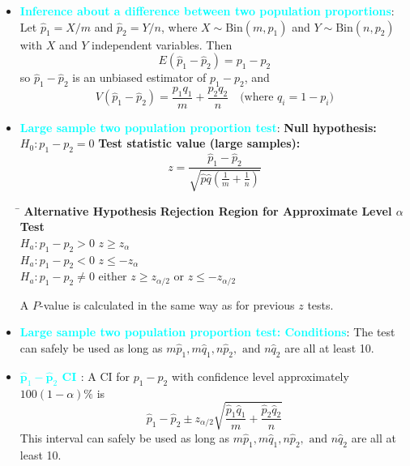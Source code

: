 \documentclass{report}
\begin{document}
\begin{itemize}
    \item \textbf{\textcolor{cyan}{Inference about a difference between two population proportions}}:
        Let $\hat{p}_1 = X/m$ and $\hat{p}_2 = Y/n$, where $X \sim \text{Bin}(m, p_1)$ and $Y \sim \text{Bin}(n, p_2)$ with $X$ and $Y$ independent variables. Then
        \[
            E(\hat{p}_1 - \hat{p}_2) = p_1 - p_2
        \]
        so $\hat{p}_1 - \hat{p}_2$ is an unbiased estimator of $p_1 - p_2$, and
        \[
            V(\hat{p}_1 - \hat{p}_2) = \frac{p_1 q_1}{m} + \frac{p_2 q_2}{n} \quad \text{(where } q_i = 1 - p_i\text{)}
        \]
    \item \textbf{\textcolor{cyan}{Large sample two population proportion test}}:
        \bigbreak \noindent 
        \textbf{Null hypothesis:} $H_0: p_1 - p_2 = 0$
        \bigbreak \noindent 
        \textbf{Test statistic value (large samples):}
        \[
            z = \frac{\hat{p}_1 - \hat{p}_2}{\sqrt{\hat{p} \hat{q} \left( \frac{1}{m} + \frac{1}{n} \right)}}
        \]
        \bigbreak \noindent 
        \begin{tabbing}
            \hspace{3cm} \= \kill
            \textbf{Alternative Hypothesis} \hspace{1.5cm} \textbf{Rejection Region for Approximate Level $\alpha$ Test} \\
            $H_a: p_1 - p_2 > 0$ \hspace{3.7cm} $z \ge z_{\alpha}$ \\
            $H_a: p_1 - p_2 < 0$ \hspace{3.7cm} $z \le -z_{\alpha}$ \\
            $H_a: p_1 - p_2 \neq 0$ \hspace{3.7cm} either $z \ge z_{\alpha/2}$ or $z \le -z_{\alpha/2}$ \\
        \end{tabbing}
        \bigbreak \noindent 
        A $P$-value is calculated in the same way as for previous $z$ tests. 
        \item \textbf{\textcolor{cyan}{Large sample two population proportion test: Conditions}}:
        The test can safely be used as long as $m\hat{p}_1, m\hat{q}_1, n\hat{p}_2, \text{ and } n\hat{q}_2$ are all at least 10.
    \item \textbf{\textcolor{cyan}{ $\hat{\mathbf{p}}_{1} -  \hat{\mathbf{p}}_{2}$ CI }}:
        A CI for $p_1 - p_2$ with confidence level approximately $100(1 - \alpha)\%$ is
        \[
            \hat{p}_1 - \hat{p}_2 \pm z_{\alpha/2} \sqrt{\frac{\hat{p}_1 \hat{q}_1}{m} + \frac{\hat{p}_2 \hat{q}_2}{n}}
        \]
        This interval can safely be used as long as $m\hat{p}_1, m\hat{q}_1, n\hat{p}_2, \text{ and } n\hat{q}_2$ are all at least 10.
    \end{itemize}
\end{document}
